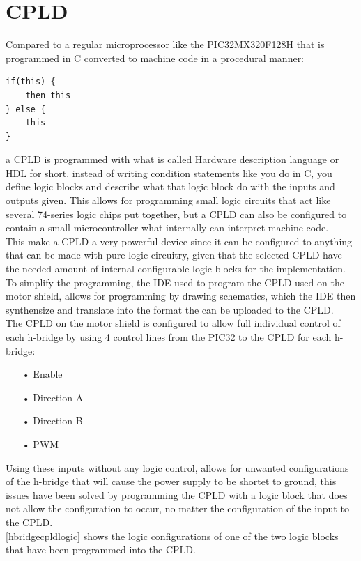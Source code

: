 \section{CPLD}
Compared to a regular microprocessor like the PIC32MX320F128H that is programmed in C converted to machine code in a procedural manner:
\begin{lstlisting}
if(this) {
	then this
} else {
	this
}
\end{lstlisting}
a CPLD is programmed with what is called Hardware description language or HDL for short.
instead of writing condition statements like you do in C, you define logic blocks and describe what that logic block do with the inputs and outputs given. \cite{HDL}
This allows for programming small logic circuits that act like several 74-series logic chips put together, but a CPLD can also be configured to contain a small microcontroller what internally can interpret machine code.\\ 
This make a CPLD a very powerful device since it can be configured to anything that can be made with pure logic circuitry, given that the selected CPLD have the needed amount of internal configurable logic blocks for the implementation. \cite{CPLD}
To simplify the programming, the IDE used to program the CPLD used on the motor shield, allows for programming by drawing schematics, which the IDE then synthensize and translate into the format the can be uploaded to the CPLD.\\
The CPLD on the motor shield is configured to allow full individual control of each h-bridge by using 4 control lines from the PIC32 to the CPLD for each h-bridge:
\begin{enumerate}
	\item[•]Enable
	\item[•]Direction A
	\item[•]Direction B
	\item[•]PWM
\end{enumerate}
Using these inputs without any logic control, allows for unwanted configurations of the h-bridge that will cause the power supply to be shortet to ground, this issues have been solved by programming the CPLD with a logic block that does not allow the configuration to occur, no matter the configuration of the input to the CPLD.\\
\ref{hbridgecpldlogic} shows the logic configurations of one of the two logic blocks that have been programmed into the CPLD.

